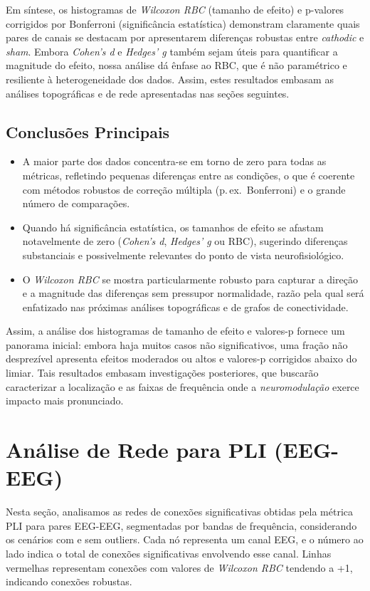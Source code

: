 Em síntese, os histogramas de \emph{Wilcoxon RBC} (tamanho de efeito) e p-valores corrigidos por Bonferroni (significância estatística) demonstram claramente quais pares de canais se destacam por apresentarem diferenças robustas entre \emph{cathodic} e \emph{sham}. Embora \emph{Cohen's d} e \emph{Hedges' g} também sejam úteis para quantificar a magnitude do efeito, nossa análise dá ênfase ao RBC, que é não paramétrico e resiliente à heterogeneidade dos dados. Assim, estes resultados embasam as análises topográficas e de rede apresentadas nas seções seguintes.

\subsection{Conclusões Principais}
\begin{itemize}
    \item A maior parte dos dados concentra-se em torno de zero para todas as métricas, refletindo pequenas diferenças entre as condições, o que é coerente com métodos robustos de correção múltipla (p.\,ex.\ Bonferroni) e o grande número de comparações.
    \item Quando há significância estatística, os tamanhos de efeito se afastam notavelmente de zero (\emph{Cohen's d}, \emph{Hedges' g} ou RBC), sugerindo diferenças substanciais e possivelmente relevantes do ponto de vista neurofisiológico.
    \item O \emph{Wilcoxon RBC} se mostra particularmente robusto para capturar a direção e a magnitude das diferenças sem pressupor normalidade, razão pela qual será enfatizado nas próximas análises topográficas e de grafos de conectividade.
\end{itemize}

Assim, a análise dos histogramas de tamanho de efeito e valores-p fornece um panorama inicial: embora haja muitos casos não significativos, uma fração não desprezível apresenta efeitos moderados ou altos e valores-p corrigidos abaixo do limiar. Tais resultados embasam investigações posteriores, que buscarão caracterizar a localização e as faixas de frequência onde a \emph{neuromodulação} exerce impacto mais pronunciado.


\section{Análise de Rede para PLI (EEG-EEG)}
\label{sec:rede_pli_eeg}

Nesta seção, analisamos as redes de conexões significativas obtidas pela métrica PLI para pares EEG-EEG, segmentadas por bandas de frequência, considerando os cenários com e sem outliers. Cada nó representa um canal EEG, e o número ao lado indica o total de conexões significativas envolvendo esse canal. Linhas vermelhas representam conexões com valores de \emph{Wilcoxon RBC} tendendo a +1, indicando conexões robustas.

